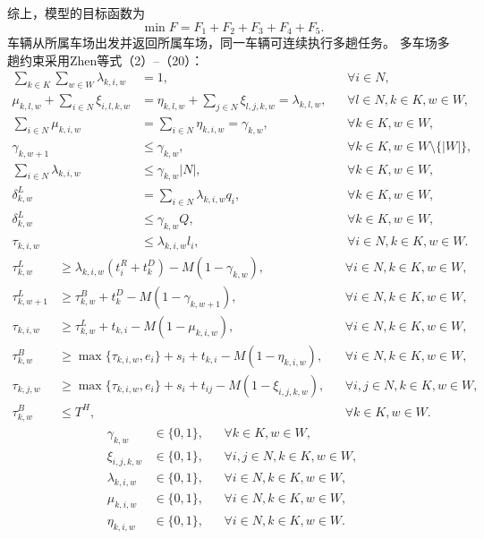 综上，模型的目标函数为
\begin{equation}
\min F=F_1+F_2+F_3+F_4+F_5.
\label{eq:obj}
\end{equation}
车辆从所属车场出发并返回所属车场，同一车辆可连续执行多趟任务。
多车场多趟约束采用Zhen等\cite{ref:44}式（2）--（20）：
\begin{align}
\sum_{k\in K}\sum_{w\in W}\lambda_{k,i,w}&=1,
&&\forall i\in N,
\label{eq:zhen-2}\\
\mu_{k,l,w}+\sum_{i\in N}\xi_{i,l,k,w}
&=\eta_{k,l,w}+\sum_{j\in N}\xi_{l,j,k,w}
=\lambda_{k,l,w},
&&\forall l\in N,k\in K,w\in W,
\label{eq:zhen-3}\\
\sum_{i\in N}\mu_{k,i,w}
&=\sum_{i\in N}\eta_{k,i,w}=\gamma_{k,w},
&&\forall k\in K,w\in W,
\label{eq:zhen-4}\\
\gamma_{k,w+1}&\le\gamma_{k,w},
&&\forall k\in K,w\in W\setminus\{|W|\},
\label{eq:zhen-5}\\
\sum_{i\in N}\lambda_{k,i,w}&\le\gamma_{k,w}|N|,
&&\forall k\in K,w\in W,
\label{eq:zhen-6}\\
\delta_{k,w}^{L}&=\sum_{i\in N}\lambda_{k,i,w}q_i,
&&\forall k\in K,w\in W,
\label{eq:zhen-7}\\
\delta_{k,w}^{L}&\le\gamma_{k,w}Q,
&&\forall k\in K,w\in W,
\label{eq:zhen-8}\\
\tau_{k,i,w}&\le\lambda_{k,i,w}l_i,
&&\forall i\in N,k\in K,w\in W.
\label{eq:zhen-9}
\end{align}
\begin{align}
\tau_{k,w}^{L}&\ge\lambda_{k,i,w}(t_i^{R}+t_k^{D})-M(1-\gamma_{k,w}),
&&\forall i\in N,k\in K,w\in W,
\label{eq:zhen-10}\\
\tau_{k,w+1}^{L}&\ge\tau_{k,w}^{B}+t_k^{D}-M(1-\gamma_{k,w+1}),
&&\forall i\in N,k\in K,w\in W,
\label{eq:zhen-11}\\
\tau_{k,i,w}&\ge\tau_{k,w}^{L}+t_{k,i}-M(1-\mu_{k,i,w}),
&&\forall i\in N,k\in K,w\in W,
\label{eq:zhen-12}\\
\tau_{k,w}^{B}&\ge\max\{\tau_{k,i,w},e_i\}+s_i+t_{k,i}-M(1-\eta_{k,i,w}),
&&\forall i\in N,k\in K,w\in W,
\label{eq:zhen-13}\\
\tau_{k,j,w}&\ge\max\{\tau_{k,i,w},e_i\}+s_i+t_{ij}-M(1-\xi_{i,j,k,w}),
&&\forall i,j\in N,k\in K,w\in W,
\label{eq:zhen-14}\\
\tau_{k,w}^{B}&\le T^{H},
&&\forall k\in K,w\in W.
\label{eq:zhen-15}
\end{align}
\begin{align}
\gamma_{k,w}&\in\{0,1\},
&&\forall k\in K,w\in W,
\label{eq:zhen-16}\\
\xi_{i,j,k,w}&\in\{0,1\},
&&\forall i,j\in N,k\in K,w\in W,
\label{eq:zhen-17}\\
\lambda_{k,i,w}&\in\{0,1\},
&&\forall i\in N,k\in K,w\in W,
\label{eq:zhen-18}\\
\mu_{k,i,w}&\in\{0,1\},
&&\forall i\in N,k\in K,w\in W,
\label{eq:zhen-19}\\
\eta_{k,i,w}&\in\{0,1\},
&&\forall i\in N,k\in K,w\in W.
\label{eq:zhen-20}
\end{align}
